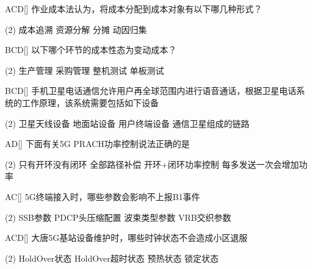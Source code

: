 \begin{choice}{\;ACD\;}[]
    作业成本法认为，将成本分配到成本对象有以下哪几种形式？

    \begin{tasks}(2)
        \task 成本追溯
        \task 资源分解
        \task  分摊
        \task 动因归集
    \end{tasks}
\end{choice}

\begin{choice}{\;BCD\;}[]
    以下哪个环节的成本性态为变动成本？
    \begin{tasks}(2)
        \task 生产管理
        \task 采购管理
        \task 整机测试
        \task 单板测试
    \end{tasks}
\end{choice}

\begin{choice}{\;BCD\;}[]
    手机卫星电话通信允许用户再全球范围内进行语音通话，根据卫星电话系统的工作原理，该系统需要包括如下设备
    \begin{tasks}(2)
        \task 卫星天线设备
        \task 地面站设备
        \task 用户终端设备
        \task 通信卫星组成的链路
    \end{tasks}
\end{choice}

\begin{choice}{\;AD\;}[]
    下面有关5G PRACH功率控制说法正确的是
    \begin{tasks}(2)
        \task 只有开环没有闭环
        \task 全部路径补偿
        \task 开环+闭环功率控制
        \task 每多发送一次会增加功率
    \end{tasks}
\end{choice}

\begin{choice}{\;AC\;}[]
    5G终端接入时，哪些参数会影响不上报B1事件
    \begin{tasks}(2)
        \task SSB参数
        \task PDCP头压缩配置
        \task 波束类型参数
        \task VRB交织参数
    \end{tasks}
\end{choice}

\begin{choice}{\;ACD\;}[]
    大唐5G基站设备维护时，哪些时钟状态不会造成小区退服
    \begin{tasks}(2)
        \task HoldOver状态
        \task HoldOver超时状态
        \task 预热状态
        \task 锁定状态
    \end{tasks}
\end{choice}

